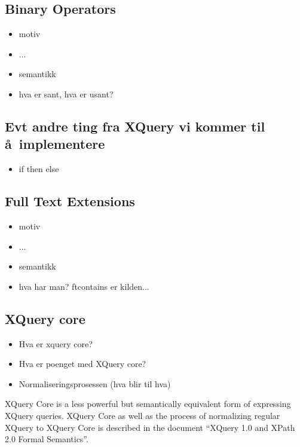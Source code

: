\subsection{Binary Operators}

\begin{itemize}
\item motiv
\item ...
\item semantikk
\item hva er sant, hva er usant?
\end{itemize}

\subsection{Evt andre ting fra XQuery vi kommer til \aa~implementere}

\begin{itemize}
\item if then else

\end{itemize}

\subsection{Full Text Extensions}

\begin{itemize}
\item motiv
\item ...
\item semantikk
\item hva har man? ftcontains er kilden...
\end{itemize}

\subsection{XQuery core}
\begin{itemize}
  \item Hva er xquery core?
  \item Hva er poenget med XQuery core?
  \item Normaliseringsprosessen (hva blir til hva)
\end{itemize}

XQuery Core is a less powerful but semantically equivalent form of expressing
XQuery queries. XQuery Core as well as the process of normalizing regular
XQuery to XQuery Core is described in the document ``XQuery 1.0 and XPath 2.0
Formal Semantics''\cite{xquery_semantics}.

